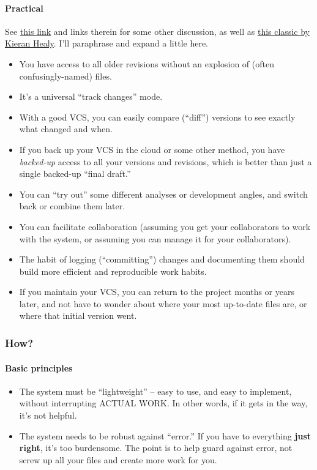 \documentclass[11pt]{article}
\begin{document}
\paragraph{Practical}
\label{sec-3-1-2-3}

See \href{http://jeromyanglim.blogspot.com/2010/11/getting-started-with-git-egit-eclipse.html}{this link} and links therein for some other discussion, as well as \href{http://www.kieranhealy.org/files/misc/workflow-apps.pdf}{this classic by Kieran Healy}. I'll paraphrase and expand a little here.
\begin{itemize}
\item You have access to all older revisions without an explosion of (often confusingly-named) files.
\item It's a universal ``track changes'' mode.
\item With a good VCS, you can easily compare (``diff'') versions to see exactly what changed and when.
\item If you back up your VCS in the cloud or some other method, you have \emph{backed-up} access to all your versions and revisions, which is better than just a single backed-up ``final draft.''
\item You can ``try out'' some different analyses or development angles, and switch back or combine them later.
\item You can facilitate collaboration (assuming you get your collaborators to work with the system, or assuming you can manage it for your collaborators).
\item The habit of logging (``committing'') changes and documenting them should build more efficient and reproducible work habits.
\item If you maintain your VCS, you can return to the project months or years later, and not have to wonder about where your most up-to-date files are, or where that initial version went.
\end{itemize}
\subsubsection{How?}
\label{sec-3-1-3}
\paragraph{Basic principles}
\label{sec-3-1-3-1}

\begin{itemize}
\item The system must be ``lightweight'' -- easy to use, and easy to implement, without interrupting ACTUAL WORK. In other words, if it gets in the way, it's not helpful.
\item The system needs to be robust against ``error.'' If you have to everything \textbf{just right}, it's too burdensome. The point is to help guard against error, not screw up all your files and create more work for you.
\end{itemize}
\end{document}
